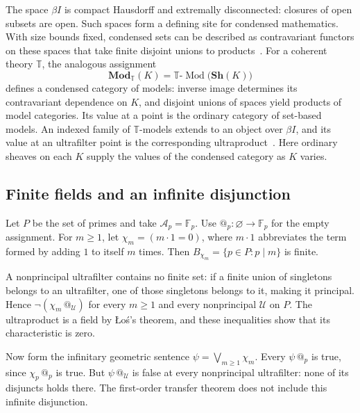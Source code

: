 \documentclass[11pt]{article}
\makeatletter
\newcommand{\atsign}{\mathord{@}}
\makeatother
\begin{document}
The space \(\beta I\) is compact Hausdorff and extremally disconnected:
closures of open subsets are open.
Such spaces form a defining site for condensed mathematics. With size
bounds fixed, condensed sets can be described as contravariant functors
on these spaces that take finite disjoint unions to
products~\cite[Example~2.5 and Proposition~2.8]{ScholzeCondensed}.
For a coherent theory \(\mathbb T\), the analogous assignment
\[
\mathbf{Mod}_{\mathbb T}(K)
=\mathbb T\text{-}\operatorname{Mod}\bigl(\mathbf{Sh}(K)\bigr)
\]
defines a condensed category of models: inverse image determines its
contravariant dependence on \(K\), and disjoint unions of spaces yield
products of model categories. Its value at a point is the ordinary
category of set-based models. An indexed family of \(\mathbb T\)-models
extends to an object
over \(\beta I\), and its value at an ultrafilter point is the
corresponding ultraproduct~\cite[Example~0.2 and Proposition~1.6]{HaineCondensedPoints}.
Here ordinary sheaves on each \(K\) supply the values of the condensed
category as \(K\) varies.

\subsection{Finite fields and an infinite disjunction}

Let \(P\) be the set of primes and take \(\mathcal A_p=\mathbb F_p\).
Use \(\atsign_p:\varnothing\to\mathbb F_p\) for the empty assignment.
For \(m\geq1\), let
\(\chi_m=(m\cdot1=0)\), where \(m\cdot1\) abbreviates the term formed
by adding \(1\) to itself \(m\) times. Then
\(B_{\chi_m}=\{p\in P:p\mid m\}\) is finite.

A nonprincipal ultrafilter contains no finite set: if a finite union of
singletons belongs to an ultrafilter, one of those singletons belongs
to it, making it principal. Hence
\(\neg(\chi_m\,\atsign_{\mathcal U})\) for every \(m\geq1\) and every
nonprincipal \(\mathcal U\) on \(P\).
The ultraproduct is a field by \L{}o\'s's theorem, and these inequalities
show that its characteristic is zero.

Now form the infinitary geometric sentence
\(\psi=\bigvee_{m\geq1}\chi_m\).
Every \(\psi\,\atsign_p\) is true, since \(\chi_p\,\atsign_p\) is true.
But \(\psi\,\atsign_{\mathcal U}\) is false at every nonprincipal
ultrafilter: none of its disjuncts holds there.
The first-order transfer theorem does not include this infinite
disjunction.
\end{document}
